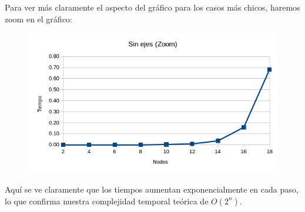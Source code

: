 Para ver m\'as claramente el aspecto del gr\'afico para los casos m\'as chicos, haremos zoom en el gr\'afico:\\

\begin{figure}[h!]
   \begin{center}
 	\includegraphics[scale=0.7]{imagenes/exacto/Vacio(zoom).png}
   \end{center}
 \end{figure}
\newpage

Aqu\'i se ve claramente que los tiempos aumentan exponencialmente en cada paso, lo que confirma nuestra complejidad temporal te\'orica de $O(2^n)$.\\
